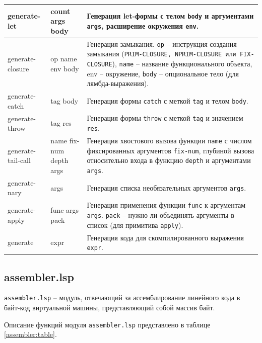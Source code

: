 \begin{xltabular}{\textwidth}{|p{2.5cm}|p{2.5cm}|X|}
	generate-let & count args body & Генерация let-формы с телом \texttt{body} и аргументами \texttt{args}, расширение окружения \texttt{env}. \\ \hline
	generate-closure & op name env body & Генерация замыкания. \texttt{op} -- инструкция создания замыкания (\texttt{PRIM-CLOSURE, \texttt{NPRIM-CLOSURE} или \texttt{FIX-CLOSURE}}), \texttt{name} -- название функционального объекта, env -- окружение, \texttt{body} -- опциональное тело (для лямбда-выражения). \\ \hline
	generate-catch & tag body & Генерация формы \texttt{catch} с меткой \texttt{tag} и телом \texttt{body}. \\ \hline
	generate-throw & tag res & Генерация формы \texttt{throw} с меткой \texttt{tag} и значением \texttt{res}. \\ \hline
	generate-tail-call & name fix-num depth args & Генерация хвостового вызова функции \texttt{name} с числом фиксированных аргументов \texttt{fix-num}, глубиной вызова относительно входа в функцию \texttt{depth} и аргументами \texttt{args}. \\ \hline
	generate-nary & args & Генерация списка необязательных аргументов \texttt{args}. \\ \hline
	generate-apply & func args pack & Генерация применения функции \texttt{func} к аргументам \texttt{args}. \texttt{pack} -- нужно ли объединять аргументы в список (для примитива \texttt{apply}). \\ \hline
	generate & expr & Генерация кода для скомпилированного выражения \texttt{expr}. \\ \hline
\end{xltabular}
\renewcommand{\arraystretch}{1.0} %


\subsection{assembler.lsp}

\texttt{assembler.lsp} -- модуль, отвечающий за ассемблирование линейного кода в байт-код виртуальной машины, представляющий собой массив байт.

Описание функций модуля \texttt{assembler.lsp} представлено в таблице \ref{assembler:table}.

